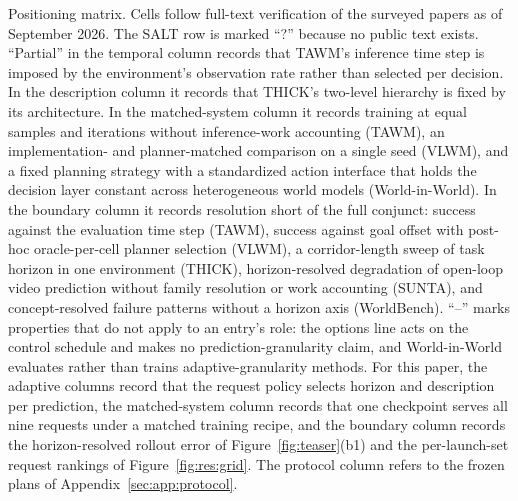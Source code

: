 \begin{table}[t]
\caption{Positioning matrix. Cells follow full-text verification of the surveyed papers as of September 2026. The SALT row is marked ``?'' because no public text exists. ``Partial'' in the temporal column records that TAWM's inference time step is imposed by the environment's observation rate rather than selected per decision. In the description column it records that THICK's two-level hierarchy is fixed by its architecture. In the matched-system column it records training at equal samples and iterations without inference-work accounting (TAWM), an implementation- and planner-matched comparison on a single seed (VLWM), and a fixed planning strategy with a standardized action interface that holds the decision layer constant across heterogeneous world models (World-in-World). In the boundary column it records resolution short of the full conjunct: success against the evaluation time step (TAWM), success against goal offset with post-hoc oracle-per-cell planner selection (VLWM), a corridor-length sweep of task horizon in one environment (THICK), horizon-resolved degradation of open-loop video prediction without family resolution or work accounting (SUNTA), and concept-resolved failure patterns without a horizon axis (WorldBench). ``--'' marks properties that do not apply to an entry's role: the options line acts on the control schedule and makes no prediction-granularity claim, and World-in-World evaluates rather than trains adaptive-granularity methods. For this paper, the adaptive columns record that the request policy selects horizon and description per prediction, the matched-system column records that one checkpoint serves all nine requests under a matched training recipe, and the boundary column records the horizon-resolved rollout error of Figure~\ref{fig:teaser}(b1) and the per-launch-set request rankings of Figure~\ref{fig:res:grid}. The protocol column refers to the frozen plans of Appendix~\ref{sec:app:protocol}.}
\label{tab:app:matrix}
\end{table}


